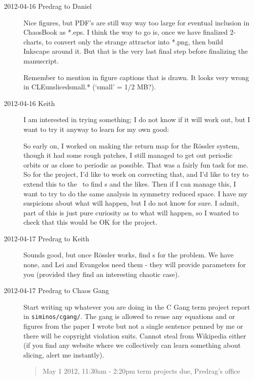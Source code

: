 \begin{description}
\item[2012-04-16 Predrag to Daniel] Nice figures, but PDF's are still way
way too large for eventual inclusion in ChaosBook as *.eps. I think the
way to go is, once we have finalized 2-charts, to convert only the
strange attractor into *.png, then build Inkscape around it. But that is
the very last final step before finalizing the manuscript.

Remember to mention in figure captions that  is drawn. It looks
very wrong in CLEunslicedsmall.* (`small' = 1/2 MB?).


\item[2012-04-16 Keith]
I am interested in trying something; I do not know if it will work out,
but I want to try it anyway to learn for my own good:

So early on, I worked on making the return map for the R\"ossler system,
though it had some rough patches, I still managed to get out periodic
orbits or as close to periodic as possible.  That was a fairly fun task
for me.  So for the project, I'd like to work on correcting that, and I'd
like to try to extend this to the \cLf\ to find \rpo s and the
likes.  Then if I can manage this, I want to try to do the same analysis
in symmetry reduced space.  I have my suspicions about what will happen,
but I do not know for sure.  I admit, part of this is just pure curiosity
as to what will happen, so I wanted to check that this would be OK for
the project.

\item[2012-04-17 Predrag to Keith] Sounds good, but once R\"ossler works,
find \rpo s for the {\twoMode} problem. We have none, and Lei and Evangelos
need them - they will provide parameters for you (provided they find an
interesting chaotic case).

\item[2012-04-17 Predrag to Chaos Gang]
Start writing up whatever you are doing in the C Gang term project report
in \texttt{siminos/cgang/}. The gang is allowed to reuse any equations
and or figures from the paper I wrote but not a single
sentence penned by me or there will be copyright violation suits. Cannot
steal from Wikipedia either (if you find any website where we
collectively can learn something about slicing, alert me instantly).

\begin{quote}
{\color{red} \large
May 1 2012,  11:30am - 2:20pm term projects due, Predrag's office
}
\end{quote}


\end{description}
